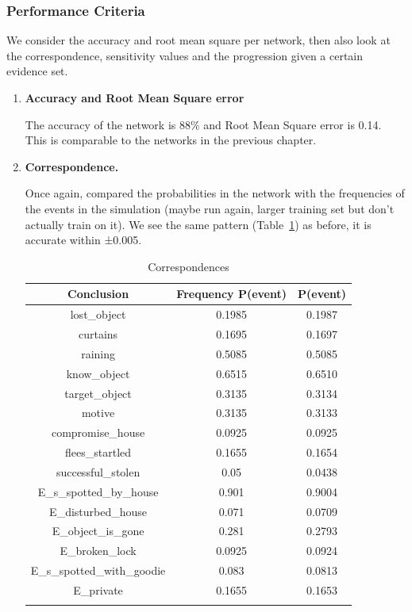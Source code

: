 \subsubsection{Performance Criteria}
We consider the accuracy and root mean square per network, then also look at the correspondence, sensitivity values and the progression given a certain evidence set.
\begin{enumerate}
\item \textbf{Accuracy and Root Mean Square error}

The accuracy of the network is 88\% and Root Mean Square error is 0.14. This is comparable to the networks in the previous chapter.

\item \textbf{Correspondence.}

Once again, compared the probabilities in the network with the frequencies of the events in the simulation (maybe run again, larger training set but don't actually train on it). We see the same pattern (Table~\ref{test}) as before, it is accurate within ±0.005. 

\begin{table}
\centering
\begin{tabular}{|c|c|c|}
 \hline
 Conclusion & Frequency P(event) & P(event)\\
 \hline
lost\_object   & 0.1985 & 0.1987\\
curtains & 0.1695 &  0.1697\\
raining & 0.5085 &  0.5085\\
know\_object & 0.6515 &  0.6510\\
target\_object & 0.3135 & 0.3134\\
motive & 0.3135 & 0.3133\\
compromise\_house & 0.0925 & 0.0925 \\
flees\_startled & 0.1655 &  0.1654\\
successful\_stolen & 0.05 & 0.0438\\ 
E\_s\_spotted\_by\_house&  0.901 & 0.9004 \\ 
E\_disturbed\_house& 0.071 &  0.0709\\ 
E\_object\_is\_gone&  0.281 &  0.2793\\ 
E\_broken\_lock&  0.0925 &  0.0924\\ 
E\_s\_spotted\_with\_goodie& 0.083  & 0.0813 \\ 
E\_private&  0.1655 & 0.1653\\ 
\hline
\label{test}
\end{tabular}
\caption{Correspondences}
\end{table}



\end{enumerate}
